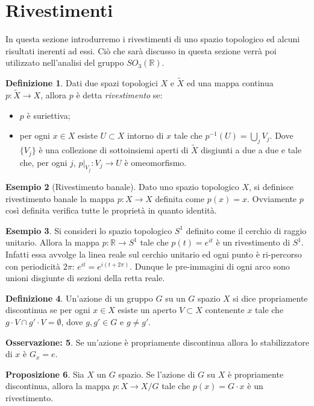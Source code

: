 \documentclass[12pt,a4paper]{report}
\theoremstyle{definition}
\newtheorem{Def}{Definizione}[chapter]
\newtheorem{Prop}[Def]{Proposizione}
\theoremstyle{definition}
\newtheorem{Ex}[Def]{Esempio}
\theoremstyle{definition}
\theoremstyle{definition}
\newtheorem{Obs}[Def]{Osservazione:}
\begin{document}
\section{Rivestimenti}
In questa sezione introdurremo i rivestimenti di uno spazio topologico ed alcuni risultati inerenti ad essi. Ciò che sarà discusso in questa sezione verrà poi utilizzato nell'analisi del gruppo $SO_3(\mathbb{R})$.
\begin{Def}
	Dati due spazi topologici $X$ e $\tilde{X}$ ed una mappa continua $p:\tilde{X}\rightarrow X$, allora $p$ è detta \textit{rivestimento} se:
	\begin{itemize}
		\item $p$ è suriettiva;
		\item per ogni $x\in X$ esiste $U\subset X$ intorno di $x$ tale che $p^{-1}(U)=\bigcup_j V_j$. Dove $\{V_j\}$ è una collezione di sottoinsiemi aperti di $\tilde{X}$ disgiunti a due a due e tale che, per ogni $j$, $p\rvert_{V_j}:V_j\rightarrow U$ è omeomorfismo. 
	\end{itemize}
\end{Def}
\begin{Ex}[Rivestimento banale]
	Dato uno spazio topologico $X$, si definisce rivestimento banale la mappa $p:X\rightarrow X$ definita come $p(x)=x$. Ovviamente $p$ così definita verifica tutte le proprietà in quanto identità.
\end{Ex}
\begin{Ex}
	Si consideri lo spazio topologico $S^1$ definito come il cerchio di raggio unitario. Allora la mappa $p:\mathbb{R}\rightarrow S^1$ tale che $p(t)=e^{it}$ è un rivestimento di $S^1$. Infatti essa avvolge la linea reale sul cerchio unitario ed ogni punto è ri-percorso con periodicità $2\pi$: $e^{it}=e^{i(t+2\pi)}$. Dunque le pre-immagini di ogni arco sono unioni disgiunte di sezioni della retta reale.
\end{Ex}
\begin{Def}
	Un'azione di un gruppo $G$ su un $G$ spazio $X$ si dice propriamente discontinua se per ogni $x\in X$ esiste un aperto $V\subset X$ contenente $x$ tale che $g\cdot V\cap g'\cdot V=\emptyset$, dove $g,g'\in G$ e $g\neq g'$.
\end{Def}
\begin{Obs}
	Se un'azione è propriamente discontinua allora lo stabilizzatore di $x$ è $G_x={e}$.
\end{Obs}
\begin{Prop}
	Sia $X$ un $G$ spazio. Se l'azione di $G$ su $X$ è propriamente discontinua, allora la mappa $p:X\rightarrow X/G$ tale che $p(x)=G\cdot x$ è un rivestimento.
\end{Prop}
\end{document}

